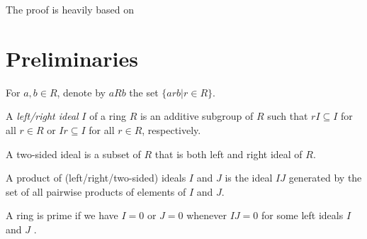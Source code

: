 %

The proof is heavily based on \cite{bresar2024wedderburnartintheorem}

\section{Preliminaries}
  \begin{definition}
      \leanok
      For $a, b \in R$, denote by $aRb$ the set $\{arb| r \in R\}$.
  \end{definition}

  \begin{definition}
    A \textit{left/right ideal} $I$ of a ring $R$ is an additive subgroup of $R$ such that $rI \subseteq I$ for all $r \in R$ or $Ir \subseteq I$ for all $r \in R$, respectively.
  \end{definition}

  \begin{definition}
    A two-sided ideal is a subset of $R$ that is both left and right ideal of $R$.
  \end{definition}

  \begin{definition}
    A product of (left/right/two-sided) ideals $I$ and $J$ is the ideal $IJ$ generated by the set of all pairwise products of elements of $I$ and $J$.
  \end{definition}

  \begin{definition}
    \leanok
    A ring is prime if we have $I = 0$ or $J = 0$ whenever $IJ = 0$ for some left ideals $I$ and $J$ .
  \end{definition}

